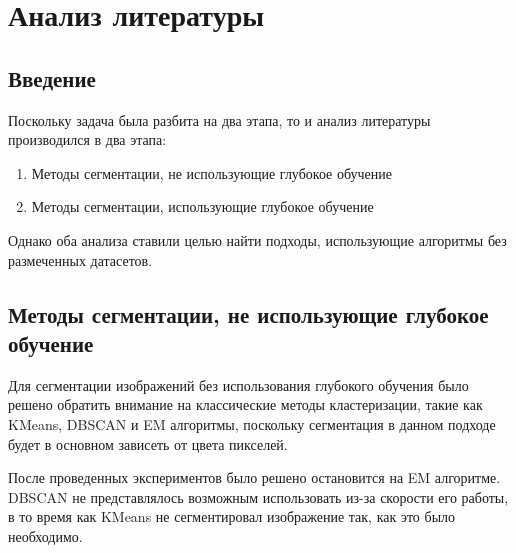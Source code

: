\section{Анализ литературы}
\subsection{Введение}
Поскольку задача была разбита на два этапа, то и анализ литературы производился в два этапа:
\begin{enumerate}
    \item Методы сегментации, не использующие глубокое обучение
    \item Методы сегментации, использующие глубокое обучение
\end{enumerate}

Однако оба анализа ставили целью найти подходы, использующие алгоритмы без размеченных датасетов.

\subsection{Методы сегментации, не использующие глубокое обучение}
Для сегментации изображений без использования глубокого обучения было решено обратить внимание на классические методы кластеризации, 
такие как KMeans\cite{kmeans}, DBSCAN\cite{dbscan} и EM\cite{em1} алгоритмы, поскольку сегментация в данном подходе будет в основном зависеть от цвета пикселей.

После проведенных экспериментов было решено остановится на EM алгоритме. DBSCAN не представлялось возможным использовать из-за скорости его работы, в то время 
как KMeans не сегментировал изображение так, как это было необходимо.


